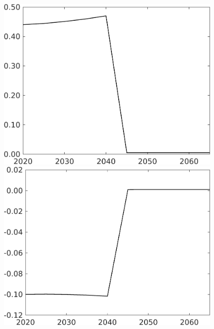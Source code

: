 \begin{figure}[h!!!]
\begin{minipage}[]{0.32\textwidth}
	\end{minipage}
	\begin{minipage}[]{0.32\textwidth}
		\includegraphics[width=1\textwidth]{../../codding_model/own_basedOnFried/optimalPol_010922_revision/figures/all_13Sept22_Tplus30/gAg_OPT_COMPtaulPer_regime4_spillover0_knspil1_noskill1_sep0_xgrowth0_PV1_etaa0.79.png}
	\end{minipage}
	\begin{minipage}[]{0.32\textwidth}
		\includegraphics[width=1\textwidth]{../../codding_model/own_basedOnFried/optimalPol_010922_revision/figures/all_13Sept22_Tplus30/gAn_OPT_COMPtaulPer_regime4_spillover0_knspil1_noskill1_sep0_xgrowth0_PV1_etaa0.79.png}

\end{minipage}
\end{figure}
